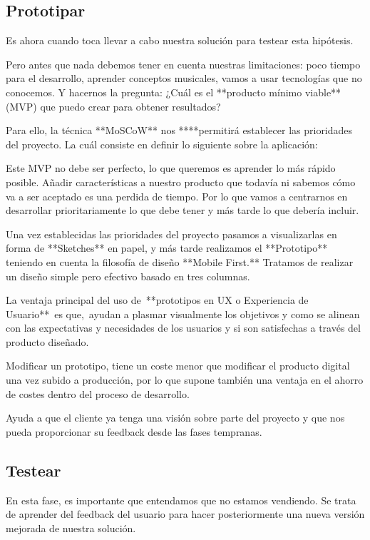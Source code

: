 \documentclass[12pt,twoside,titlepage]{report}
\begin{document}
\subsection{Prototipar}

Es ahora cuando toca llevar a cabo nuestra solución para testear esta hipótesis. 

Pero antes que nada debemos tener en cuenta nuestras limitaciones: poco tiempo para el desarrollo, aprender conceptos musicales, vamos a usar tecnologías que no conocemos. Y hacernos la pregunta: ¿Cuál es el **producto mínimo viable** (MVP) que puedo crear para obtener resultados?

Para ello, la técnica **MoSCoW** nos ****permitirá establecer las prioridades del proyecto. La cuál consiste en definir lo siguiente sobre la aplicación:

Este MVP no debe ser perfecto, lo que queremos es aprender lo más rápido posible. Añadir características a nuestro producto que todavía ni sabemos cómo va a ser aceptado es una perdida de tiempo. Por lo que vamos a centrarnos en desarrollar prioritariamente lo que debe tener y más tarde lo que debería incluir.

Una vez establecidas las prioridades del proyecto pasamos a visualizarlas en forma de **Sketches** en papel, y más tarde realizamos el **Prototipo** teniendo en cuenta la filosofía de diseño **Mobile First.** Tratamos de realizar un diseño simple pero efectivo basado en tres columnas.

La ventaja principal del uso de **prototipos en UX o Experiencia de Usuario** es que, ayudan a plasmar visualmente los objetivos y como se alinean con las expectativas y necesidades de los usuarios y si son satisfechas a través del producto diseñado.

Modificar un prototipo, tiene un coste menor que modificar el producto digital una vez subido a producción, por lo que supone también una ventaja en el ahorro de costes dentro del proceso de desarrollo.

Ayuda a que el cliente ya tenga una visión sobre parte del proyecto y que nos pueda proporcionar su feedback desde las fases tempranas.

\subsection{Testear}

En esta fase, es importante que entendamos que no estamos vendiendo. Se trata de aprender del feedback del usuario para hacer posteriormente una nueva versión mejorada de nuestra solución.
\end{document}
